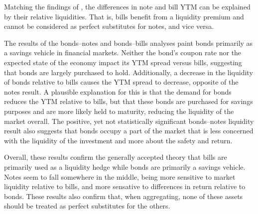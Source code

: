 \documentclass[11pt,a4paper,margin=1.5in]{article}
\begin{document}
Matching the findings of \citet{Amihud-Mendelson:1991}, the differences in note and bill YTM can be explained by their relative liquidities.
That is, bills benefit from a liquidity premium and cannot be considered as perfect substitutes for notes, and vice versa.

The results of the bonds--notes and bonds--bills analyses paint bonds primarily as a savings vehicle in financial markets. 
Neither the bond's coupon rate nor the expected state of the economy impact its YTM spread versus bills, suggesting that bonds are largely purchased to hold.
Additionally, a decrease in the liquidity of bonds relative to bills causes the YTM spread to decrease, opposite of the notes result. 
A plausible explanation for this is that the demand for bonds reduces the YTM relative to bills, but that these bonds are purchased for savings purposes and are more likely held to maturity, reducing the liquidity of the market overall.
The positive, yet not statistically significant bonds--notes liquidity result also suggests that bonds occupy a part of the market that is less concerned with the liquidity of the investment and more about the safety and return.


Overall, these results confirm the generally accepted theory that bills are primarily used as a liquidity hedge while bonds are primarily a savings vehicle.
Notes seem to fall somewhere in the middle, being more sensitive to market liquidity relative to bills, and more sensative to differences in return relative to bonds.
These results also confirm that, when aggregating, none of these assets should be treated as perfect substitutes for the others.

\end{document}
